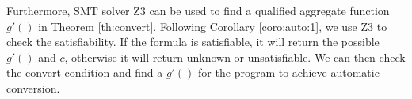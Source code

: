 Furthermore, SMT solver Z3 can be used to find a qualified aggregate function $g'()$ in Theorem \ref{th:convert}.
Following Corollary \ref{coro:auto:1}, we use Z3 to check the satisfiability. If the formula is satisfiable, it will return the possible $g'()$ and $c$, otherwise it will return unknown or unsatisfiable. We can then check the convert condition and find a $g'()$ for the program to achieve automatic conversion.
